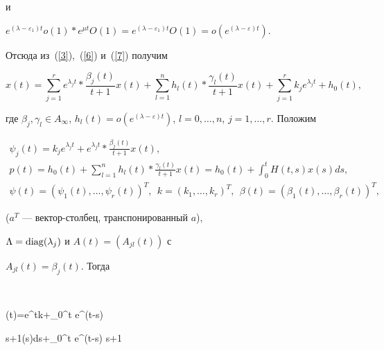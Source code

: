 и


$e^{(\lambda-\varepsilon_1) t} o (1)* e^{\mu t} O (1)=


e^{(\lambda-\varepsilon_1) t}O (1)=


o (e^{(\lambda-\varepsilon)t})$.


Отсюда из~(\ref{3}),~(\ref{6}) и~(\ref{7}) получим


$$


x (t)=\sum\limits_{j=1}^r


e^{\lambda_j t }*\frac{\beta_j (t)}{t+1}x (t)+


\sum\limits_{l=1}^n h_l (t)* \frac{\gamma_l (t)}{t+1}


x (t)+\sum\limits_{j=1}^r k_j e^{\lambda_j t }+h_0 (t),


$$


где $\beta_j, \gamma_l \in A_{\infty}$, $h_l (t)=o (e^{(\lambda-


\varepsilon) t})$, $l=0,\dotsc,n$, $j=1,\dotsc,r$. Положим


\begin{gather*}


\psi_j (t)=k_j e^{\lambda_j t }+e^{\lambda_j t }*


\frac{\beta_j (t)}{t+1}x (t), \\


%


p (t)=h_0 (t)+\sum\limits_{l=1}^n h_l (t)*


\frac{\gamma_l (t)}{t+1} x (t)=h_0 (t)+


\int_0^t H (t,s) x (s) ds, \\


%


\psi (t)=


(\psi_1 (t),\dotsc,\psi_r (t))^T,


\ \ k=(k_1,\dotsc,k_r)^T,


\ \ \beta (t)=(\beta_1 (t),\dotsc,\beta_r (t))^T,


\end{gather*}


($a^T$ --- вектор-столбец, транспонированный $a$),


$\Lambda=\operatorname{diag} (\lambda_j)$ и $A (t)=(A_{jl} (t))$ с


$A_{jl} (t)=\beta_j (t)$. Тогда


$$


\psi(t)=e^{\Lambda t}k+\int_0^t e^{\Lambda (t-s)} 


{s+1}\psi(s)ds+\int_0^t e^{\Lambda (t-s)}  {s+1}


